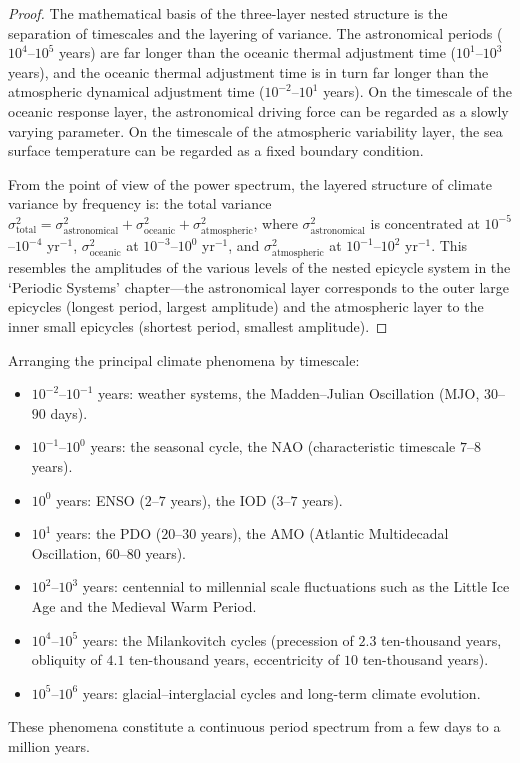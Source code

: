 \begin{proof}
The mathematical basis of the three-layer nested structure is the separation of timescales and the layering of variance. The astronomical periods ($10^4$--$10^5$ years) are far longer than the oceanic thermal adjustment time ($10^1$--$10^3$ years), and the oceanic thermal adjustment time is in turn far longer than the atmospheric dynamical adjustment time ($10^{-2}$--$10^1$ years). On the timescale of the oceanic response layer, the astronomical driving force can be regarded as a slowly varying parameter. On the timescale of the atmospheric variability layer, the sea surface temperature can be regarded as a fixed boundary condition.

From the point of view of the power spectrum, the layered structure of climate variance by frequency is: the total variance $\sigma^2_{\text{total}} = \sigma^2_{\text{astronomical}} + \sigma^2_{\text{oceanic}} + \sigma^2_{\text{atmospheric}}$, where $\sigma^2_{\text{astronomical}}$ is concentrated at $10^{-5}$--$10^{-4}$ yr$^{-1}$, $\sigma^2_{\text{oceanic}}$ at $10^{-3}$--$10^0$ yr$^{-1}$, and $\sigma^2_{\text{atmospheric}}$ at $10^{-1}$--$10^2$ yr$^{-1}$. This resembles the amplitudes of the various levels of the nested epicycle system in the `Periodic Systems' chapter---the astronomical layer corresponds to the outer large epicycles (longest period, largest amplitude) and the atmospheric layer to the inner small epicycles (shortest period, smallest amplitude).
\end{proof}

\begin{remark}
Arranging the principal climate phenomena by timescale:
\begin{itemize}
    \item $10^{-2}$--$10^{-1}$ years: weather systems, the Madden--Julian Oscillation (MJO, $30$--$90$ days).
    \item $10^{-1}$--$10^0$ years: the seasonal cycle, the NAO (characteristic timescale $7$--$8$ years).
    \item $10^0$ years: ENSO ($2$--$7$ years), the IOD ($3$--$7$ years).
    \item $10^1$ years: the PDO ($20$--$30$ years), the AMO (Atlantic Multidecadal Oscillation, $60$--$80$ years).
    \item $10^2$--$10^3$ years: centennial to millennial scale fluctuations such as the Little Ice Age and the Medieval Warm Period.
    \item $10^4$--$10^5$ years: the Milankovitch cycles (precession of $2.3$ ten-thousand years, obliquity of $4.1$ ten-thousand years, eccentricity of $10$ ten-thousand years).
    \item $10^5$--$10^6$ years: glacial--interglacial cycles and long-term climate evolution.
\end{itemize}
These phenomena constitute a continuous period spectrum from a few days to a million years.
\end{remark}

